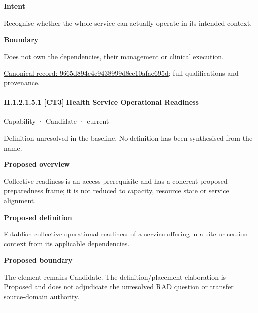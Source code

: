 \textbf{Intent}



Recognise whether the whole service can actually operate in its intended context.



\textbf{Boundary}



Does not own the dependencies, their management or clinical execution.


{\footnotesize \href{../../../../continuum/strategy/capability/9665d894c4c9438999d8cc10afae695d.md}{Canonical record: 9665d894c4c9438999d8cc10afae695d}; full qualifications and provenance.}\par
\paragraph*{II.1.2.1.5.1 [CT3] Health Service Operational Readiness}
\label{navigation:II.1.2.1.5.1}

\label{element:cc91eb4017034939ab82b152bddf7b1c}
{\small Capability · Candidate · current}\par

Definition unresolved in the baseline. No definition has been synthesised from the name.



\textbf{Proposed overview}



Collective readiness is an access prerequisite and has a coherent proposed preparedness frame; it is not reduced to capacity, resource state or service alignment.



\textbf{Proposed definition}



Establish collective operational readiness of a service offering in a site or session context from its applicable dependencies.



\textbf{Proposed boundary}



The element remains Candidate. The definition/placement elaboration is Proposed and does not adjudicate the unresolved RAD question or transfer source-domain authority.



\medskip\hrule\medskip

